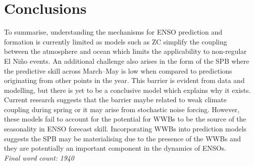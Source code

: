 \documentclass[12pt, onecolumn]{revtex4}    %
\begin{document}
\section{Conclusions}

To summarise, understanding the mechanisms for ENSO prediction and formation is currently limited as models such as ZC simplify the coupling between the atmosphere and ocean which limits the applicability to non-regular El Ni\~{n}o events. An additional challenge also arises in the form of the SPB where the predictive skill across March--May is low when compared to predictions originating from other points in the year. This barrier is evident from data and modelling, but there is yet to be a conclusive model which explains why it exists. Current research suggests that the barrier maybe related to weak climate coupling during spring or it may arise from stochastic noise forcing. However, these models fail to account for the potential for WWBs to be the source of the seasonality in ENSO forecast skill. Incorporating WWBs into prediction models suggests the SPB may be materialising due to the presence of the WWBs and they are potentially an important component in the dynamics of ENSOs. \\

\textit{Final word count: 1940}


\clearpage



\end{document}
